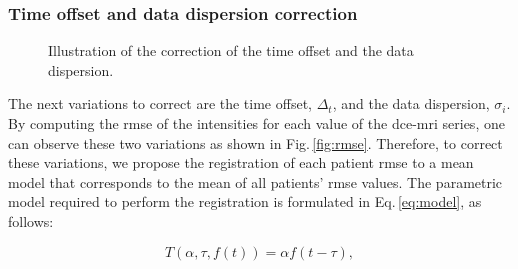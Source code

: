 \subsubsection{Time offset and data dispersion correction}

\begin{figure}
  \centering
  \hspace*{\fill}
   \hfill
  \hspace*{\fill}
  \caption{Illustration of the correction of the time offset and the data dispersion.}
  \label{fig:curveal}
\end{figure}

The next variations to correct are the time offset, $\Delta_t$, and the data dispersion, $\sigma_i$.
By computing the \ac{rmse} of the intensities for each value of the \ac{dce}-\ac{mri} series, one can observe these two variations as shown in Fig.\,\ref{fig:rmse}.
Therefore, to correct these variations, we propose the registration of
each patient \ac{rmse} to a mean model that corresponds to the mean of
all patients' \ac{rmse} values.
The parametric model required to perform the registration is
formulated in Eq.\,\eqref{eq:model}, as follows:

\begin{equation}
  T(\alpha, \tau, f(t)) = \alpha f(t - \tau) ,
  \label{eq:model}
\end{equation}

